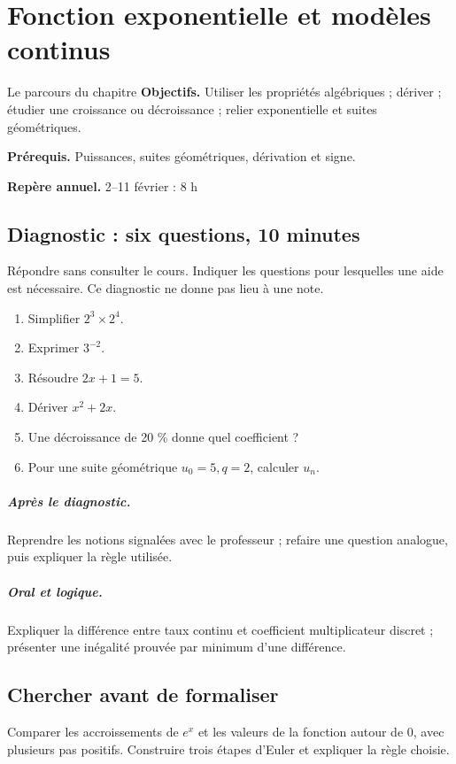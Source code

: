 \chapter{Fonction exponentielle et modèles continus}\label{C09}
\begin{repere}{Le parcours du chapitre}
\textbf{Objectifs.} Utiliser les propriétés algébriques ; dériver ; étudier une croissance ou décroissance ; relier exponentielle et suites géométriques.

\textbf{Prérequis.} Puissances, suites géométriques, dérivation et signe.

\textbf{Repère annuel.} 2–11 février : 8 h\end{repere}
\section*{Diagnostic : six questions, 10 minutes}\label{C09-D}
Répondre sans consulter le cours. Indiquer les questions pour lesquelles une aide est nécessaire. Ce diagnostic ne donne pas lieu à une note.
\begin{enumerate}
\item Simplifier $2^3\times2^4$.
\item Exprimer $3^{-2}$.
\item Résoudre $2x+1=5$.
\item Dériver $x^2+2x$.
\item Une décroissance de 20 \% donne quel coefficient ?
\item Pour une suite géométrique $u_0=5,q=2$, calculer $u_n$.
\end{enumerate}
\paragraph{Après le diagnostic.} Reprendre les notions signalées avec le professeur ; refaire une question analogue, puis expliquer la règle utilisée.
\paragraph{Oral et logique.} Expliquer la différence entre taux continu et coefficient multiplicateur discret ; présenter une inégalité prouvée par minimum d’une différence.
\clearpage
\section*{Chercher avant de formaliser}\label{C09-RECH}
Comparer les accroissements de $e^x$ et les valeurs de la fonction autour de 0, avec plusieurs pas positifs. Construire trois étapes d’Euler et expliquer la règle choisie.
